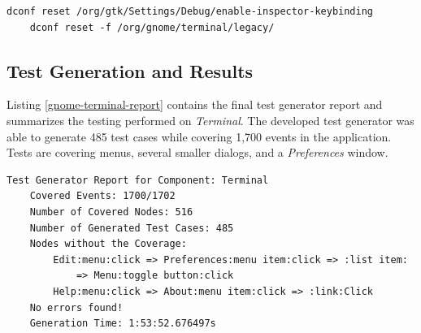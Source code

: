 \begin{lstlisting}[caption={The cleanup commands required to reset GNOME Terminal to the default settings},label={gnome-terminal-cleanup}]
    dconf reset /org/gtk/Settings/Debug/enable-inspector-keybinding
    dconf reset -f /org/gnome/terminal/legacy/
\end{lstlisting}

\subsection*{Test Generation and Results}
Listing \ref{gnome-terminal-report} contains the final test generator report and summarizes the testing performed on \textit{Terminal}. The developed test generator was able to generate 485 test cases while covering 1,700 events in the application. Tests are covering menus, several smaller dialogs, and a \textit{Preferences} window.

\begin{minipage}\linewidth
\begin{lstlisting}[caption={Final test generator report for GNOME Terminal},label={gnome-terminal-report}]
    Test Generator Report for Component: Terminal
    Covered Events: 1700/1702
    Number of Covered Nodes: 516
    Number of Generated Test Cases: 485 
    Nodes without the Coverage:
        Edit:menu:click => Preferences:menu item:click => :list item: 
            => Menu:toggle button:click
        Help:menu:click => About:menu item:click => :link:Click
    No errors found!
    Generation Time: 1:53:52.676497s
\end{lstlisting}
\end{minipage}



